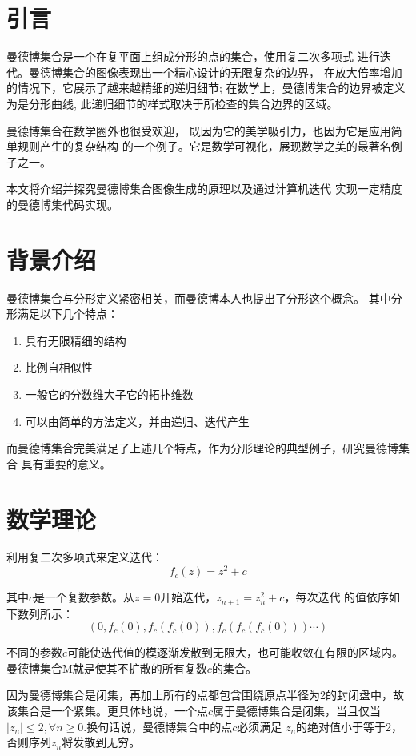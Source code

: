 \section{引言}
曼德博集合\cite{enwiki:1094796296}是一个在复平面上组成分形的点的集合，使用复二次多项式
进行迭代。曼德博集合的图像表现出一个精心设计的无限复杂的边界\cite{s1992fractal}，
在放大倍率增加的情况下，它展示了越来越精细的递归细节;
在数学上，曼德博集合的边界被定义为是分形曲线,
此递归细节的样式取决于所检查的集合边界的区域。
\par 
曼德博集合在数学圈外也很受欢迎，
既因为它的美学吸引力，也因为它是应用简单规则产生的复杂结构
的一个例子。它是数学可视化，展现数学之美的最著名例子之一。
\par
本文将介绍并探究曼德博集合图像生成的原理以及通过计算机迭代
实现一定精度的曼德博集代码实现。

\section{背景介绍}
曼德博集合与分形定义\cite{mandelbrot1982fractal}紧密相关，而曼德博本人也提出了分形这个概念。
其中分形满足以下几个特点：
\begin{enumerate}
    \setlength{\itemsep}{-5pt}
    \item 具有无限精细的结构
    \item 比例自相似性
    \item 一般它的分数维大子它的拓扑维数
    \item 可以由简单的方法定义，并由递归、迭代产生
\end{enumerate}
\par 
而曼德博集合完美满足了上述几个特点，作为分形理论的典型例子，研究曼德博集合
具有重要的意义。

\section{数学理论}
利用复二次多项式来定义迭代：
$$f_c(z)=z^2+c$$
\par 
其中$c$是一个复数参数。从$z=0$开始迭代，$z_{n+1}=z^2_n+c$，每次迭代
的值依序如下数列所示：
$$(0,f_c(0),f_c(f_c(0)),f_c(f_c(f_c(0)))\cdots)$$
\par 
不同的参数$c$可能使迭代值的模逐渐发散到无限大，也可能收敛在有限的区域内。
曼德博集合$\mathrm{M}$就是使其不扩散的所有复数$c$的集合。
\par 
因为曼德博集合是闭集，再加上所有的点都包含围绕原点半径为2的封闭盘中，故
该集合是一个紧集。更具体地说，一个点$c$属于曼德博集合是闭集，当且仅当
$|z_n|\leq 2,\forall n\geq 0$.换句话说，曼德博集合中的点$c$必须满足
$z_n$的绝对值小于等于2，否则序列$z_n$将发散到无穷。


